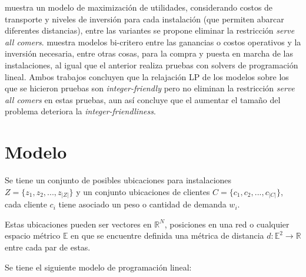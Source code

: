 \documentclass{article}
\begin{document}
\cite{mukundan1991joint} muestra un modelo de maximización de utilidades, considerando costos de transporte y niveles de inversión para cada instalación (que permiten abarcar diferentes distancias), entre las variantes se propone  eliminar la restricción \emph{serve all comers}. \cite{brimberg2000maximum} muestra modelos bi-critero entre las ganancias o costos operativos y la inversión necesaria, entre otras cosas, para la compra y puesta en marcha de las instalaciones, al igual que el anterior realiza pruebas con solvers de programación lineal. Ambos trabajos concluyen que la relajación LP de los modelos sobre los que se hicieron pruebas son \emph{integer-friendly} pero no eliminan la restricción \emph{serve all comers} en estas pruebas, aun así  \cite{brimberg2000maximum} concluye que el aumentar el tamaño del problema deteriora la \emph{integer-friendliness}.

\section{Modelo}



Se tiene un conjunto de posibles ubicaciones para instalaciones $Z = \{z_1,z_2,...,z_{|Z|}\}$ y un conjunto ubicaciones de clientes $C = \{c_1,c_2,...,c_{|C|}\}$, cada cliente $c_i$ tiene asociado un peso o cantidad de demanda $w_i$.

Estas ubicaciones pueden ser vectores en $\mathbb{R}^N$, posiciones en una red o cualquier espacio métrico $\mathbb{E}$ en que se encuentre definida una métrica de distancia $d : \mathbb{E}^2 \rightarrow \mathbb{R}$ entre cada par de estas.

Se tiene el siguiente modelo de programación lineal:
\end{document}
